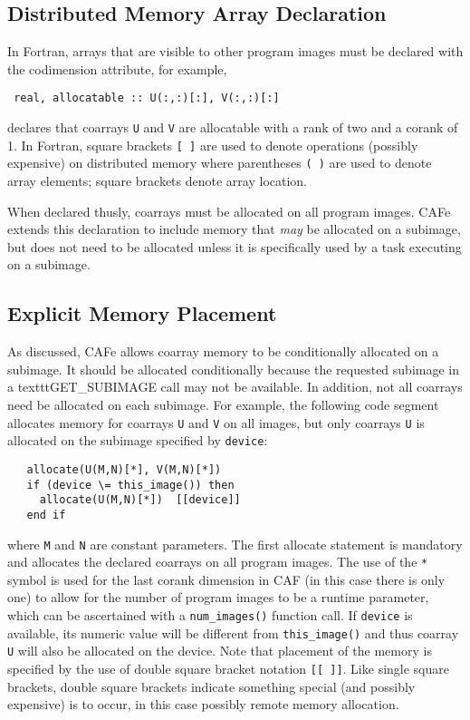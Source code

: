 \subsection{Distributed Memory Array Declaration}

In Fortran, arrays that are visible to other program images must be declared with the
codimension attribute, for example,
\begin{verbatim}
 real, allocatable :: U(:,:)[:], V(:,:)[:]
\end{verbatim}
declares that coarrays \texttt{U} and \texttt{V} are allocatable with a rank of two
and a corank of 1.  In Fortran, square brackets \texttt{[ ]} are used to denote operations
(possibly expensive) on distributed memory where parentheses \texttt{( )} are used to
denote array elements; square brackets denote array location.

When declared thusly, coarrays must be allocated on all program images.  CAFe extends this
declaration to include memory that \emph{may} be allocated on a subimage, but does not
need to be allocated unless it is specifically used by a task executing on a subimage.


\subsection{Explicit Memory Placement}

As discussed, CAFe allows coarray memory to be conditionally allocated on a subimage.
It should be allocated conditionally because the requested subimage in a texttt{GET\_SUBIMAGE}
call may not be available.  In addition, not all coarrays need be allocated on each
subimage.  For example, the following code segment allocates memory for coarrays
\texttt{U} and \texttt{V} on all images, but only coarrays \texttt{U} is allocated on
the subimage specified by \texttt{device}:
\begin{verbatim}
   allocate(U(M,N)[*], V(M,N)[*])
   if (device \= this_image()) then
     allocate(U(M,N)[*])  [[device]]
   end if
\end{verbatim}
where \texttt{M} and \texttt{N} are constant parameters.  The first allocate statement is
mandatory and allocates the declared coarrays on all program images.  The use of the
\texttt{*} symbol is used for the last corank dimension in CAF (in this case there is only
one) to allow for the number of program images to be a runtime parameter, which can be
ascertained with a \texttt{num\_images()} function call.  If \texttt{device} is
available, its numeric value will be different from \texttt{this\_image()} and thus
coarray \texttt{U} will also be allocated on the device.  Note that placement of the
memory is specified by the use of double square bracket notation \texttt{[[ ]]}.  Like
single square brackets, double square brackets indicate something special (and possibly
expensive) is to occur, in this case possibly remote memory allocation.

